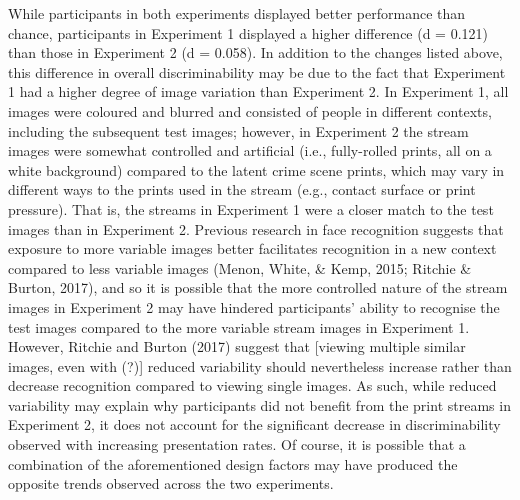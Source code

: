 \documentclass[
  english,
  man]{apa6}
\begin{document}
While participants in both experiments displayed better performance than chance, participants in Experiment 1 displayed a higher difference (d = 0.121) than those in Experiment 2 (d = 0.058). In addition to the changes listed above, this difference in overall discriminability may be due to the fact that Experiment 1 had a higher degree of image variation than Experiment 2. In Experiment 1, all images were coloured and blurred and consisted of people in different contexts, including the subsequent test images; however, in Experiment 2 the stream images were somewhat controlled and artificial (i.e., fully-rolled prints, all on a white background) compared to the latent crime scene prints, which may vary in different ways to the prints used in the stream (e.g., contact surface or print pressure). That is, the streams in Experiment 1 were a closer match to the test images than in Experiment 2. Previous research in face recognition suggests that exposure to more variable images better facilitates recognition in a new context compared to less variable images (Menon, White, \& Kemp, 2015; Ritchie \& Burton, 2017), and so it is possible that the more controlled nature of the stream images in Experiment 2 may have hindered participants' ability to recognise the test images compared to the more variable stream images in Experiment 1. However, Ritchie and Burton (2017) suggest that {[}viewing multiple similar images, even with (?){]} reduced variability should nevertheless increase rather than decrease recognition compared to viewing single images. As such, while reduced variability may explain why participants did not benefit from the print streams in Experiment 2, it does not account for the significant decrease in discriminability observed with increasing presentation rates. Of course, it is possible that a combination of the aforementioned design factors may have produced the opposite trends observed across the two experiments.
\end{document}
